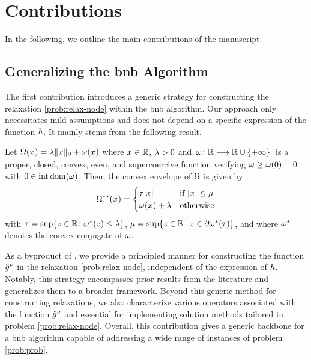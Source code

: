 \documentclass[11pt]{article}
\begin{document}
\section{Contributions}
\label{sec:contributions}

In the following, we outline the main contributions of the manuscript.

\subsection{Generalizing the \gls{bnb} Algorithm}
\label{sec:contributions:generic}

The first contribution introduces a generic strategy for constructing the relaxation \eqref{prob:relax-node} within the \gls{bnb} algorithm.
Our approach only necessitates mild assumptions and does not depend on a specific expression of the function $h$.
It mainly stems from the following result.
\begin{theorem}
    \label{thm:biconj}
    Let $\Omega(x_{}) = \lambda\|x_{}\|_0 + \omega(x_{})$ where $\pvi{} \in \kR$, $\lambda > 0$ and $\kfuncdef{\gpfunc}{\kR}{\kR \cup \{+\infty\}}$ is a proper, closed, convex, even, and supercoercive function verifying $\omega \geq \omega(0) = 0$ with $0 \in \operatorname{int}\operatorname{dom}(\omega)$.
    Then, the convex envelope of $\Omega$ is given by
    \begin{equation}
        \Omega^{**}(x_{}) = 
        \begin{cases}
            \tau |x_{}| &\text{if } |x_{}| \leq \mu \\
            \omega(x_{}) + \lambda &\text{otherwise}
        \end{cases}
    \end{equation}
    with $\pslope = \sup\kset{\bvi{} \in \kR}{\conj{\gpfunc}(\bvi{}) \leq \reg}$, $\plimit = \sup\kset{\bvi{} \in \kR}{\bvi{} \in \subdiff\conj{\gpfunc}(\pslope)}$, and where $\omega^{*}$ denotes the convex conjugate of $\omega$.
\end{theorem}
As a byproduct of , we provide a principled manner for constructing the function $\check{g}^\nu$ in the relaxation \eqref{prob:relax-node}, independent of the expression of $h$. Notably, this strategy encompasses prior results from the literature and generalizes them to a broader framework.
Beyond this generic method for constructing relaxations, we also characterize various operators associated with the function $\check{g}^\nu$ and essential for implementing solution methods tailored to problem \eqref{prob:relax-node}.
Overall, this contribution gives a generic backbone for a \gls{bnb} algorithm capable of addressing a wide range of instances of problem \eqref{prob:prob}.
\end{document}
